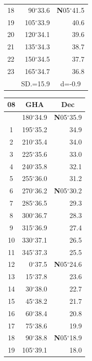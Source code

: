 \documentclass[10pt, a4paper]{report}
\begin{document}
\begin{scriptsize}
\begin{tabular*}{0.2\textwidth}[t]{@{\extracolsep{\fill}}|c|rr|}
18 & 90$^\circ$33.6 & \textbf{N}05$^\circ$41.5\\
19 & 105$^\circ$33.9 & 40.6\\
20 & 120$^\circ$34.1 & 39.6\\
21 & 135$^\circ$34.3 & \raisebox{0.24ex}{\boldmath$\cdot$~\boldmath$\cdot$~~}38.7\\
22 & 150$^\circ$34.5 & 37.7\\
23 & 165$^\circ$34.7 & 36.8\\
\hline
\rule{0pt}{2.4ex} & \multicolumn{1}{c}{SD.=15.9} & \multicolumn{1}{c|}{d=-0.9}\\
\hline
\end{tabular*}\noindent
\begin{tabular*}{0.2\textwidth}[t]{@{\extracolsep{\fill}}|c|rr|}
\hline
\multicolumn{1}{|c|}{\rule{0pt}{2.6ex}\textbf{08}} & \multicolumn{1}{c}{\textbf{GHA}} & \multicolumn{1}{c|}{\textbf{Dec}}\\
\hline\rule{0pt}{2.6ex}\noindent
0 & 180$^\circ$34.9 & \textbf{N}05$^\circ$35.9\\
1 & 195$^\circ$35.2 & 34.9\\
2 & 210$^\circ$35.4 & 34.0\\
3 & 225$^\circ$35.6 & \raisebox{0.24ex}{\boldmath$\cdot$~\boldmath$\cdot$~~}33.0\\
4 & 240$^\circ$35.8 & 32.1\\
5 & 255$^\circ$36.0 & 31.2\\[2Pt]
6 & 270$^\circ$36.2 & \textbf{N}05$^\circ$30.2\\
7 & 285$^\circ$36.5 & 29.3\\
8 & 300$^\circ$36.7 & 28.3\\
9 & 315$^\circ$36.9 & \raisebox{0.24ex}{\boldmath$\cdot$~\boldmath$\cdot$~~}27.4\\
10 & 330$^\circ$37.1 & 26.5\\
11 & 345$^\circ$37.3 & 25.5\\[2Pt]
12 & 0$^\circ$37.5 & \textbf{N}05$^\circ$24.6\\
13 & 15$^\circ$37.8 & 23.6\\
14 & 30$^\circ$38.0 & 22.7\\
15 & 45$^\circ$38.2 & \raisebox{0.24ex}{\boldmath$\cdot$~\boldmath$\cdot$~~}21.7\\
16 & 60$^\circ$38.4 & 20.8\\
17 & 75$^\circ$38.6 & 19.9\\[2Pt]
18 & 90$^\circ$38.8 & \textbf{N}05$^\circ$18.9\\
19 & 105$^\circ$39.1 & 18.0\\

\end{tabular*}
\end{scriptsize}
\end{document}
